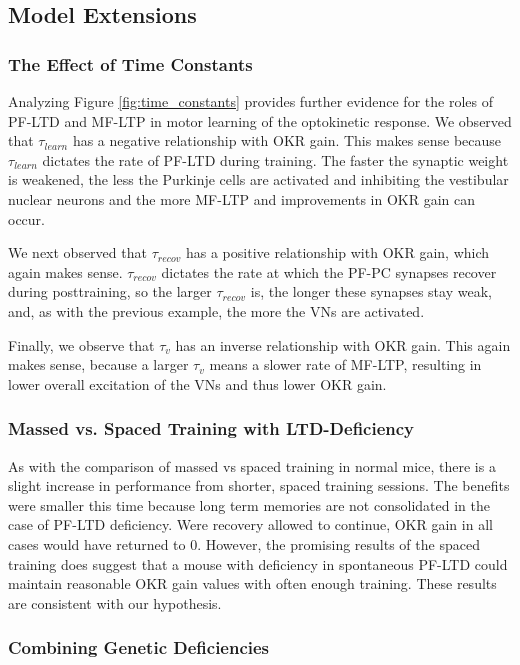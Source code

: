 \documentclass[10pt]{article}
\begin{document}
\subsection{Model Extensions}

\subsubsection{The Effect of Time Constants}

Analyzing Figure \ref{fig:time_constants} provides further evidence for the roles of PF-LTD and MF-LTP in motor learning of the optokinetic response. We observed that \(\tau_{learn}\) has a negative relationship with OKR gain. This makes sense because \(\tau_{learn}\) dictates the rate of PF-LTD during training. The faster the synaptic weight is weakened, the less the Purkinje cells are activated and inhibiting the vestibular nuclear neurons and the more MF-LTP and improvements in OKR gain can occur.

We next observed that \(\tau_{recov}\) has a positive relationship with OKR gain, which again makes sense. \(\tau_{recov}\) dictates the rate at which the PF-PC synapses recover during posttraining, so the larger \(\tau_{recov}\) is, the longer these synapses stay weak, and, as with the previous example, the more the VNs are activated.

Finally, we observe that \(\tau_v\) has an inverse relationship with OKR gain. This again makes sense, because a larger \(\tau_v\) means a slower rate of MF-LTP, resulting in lower overall excitation of the VNs and thus lower OKR gain.

\subsubsection{Massed vs. Spaced Training with LTD-Deficiency}

As with the comparison of massed vs spaced training in normal mice, there is a slight increase in performance from shorter, spaced training sessions. The benefits were smaller this time because long term memories are not consolidated in the case of PF-LTD deficiency. Were recovery allowed to continue, OKR gain in all cases would have returned to 0. However, the promising results of the spaced training does suggest that a mouse with deficiency in spontaneous PF-LTD could maintain reasonable OKR gain values with often enough training. These results are consistent with our hypothesis.

\subsubsection{Combining Genetic Deficiencies}
\end{document}

